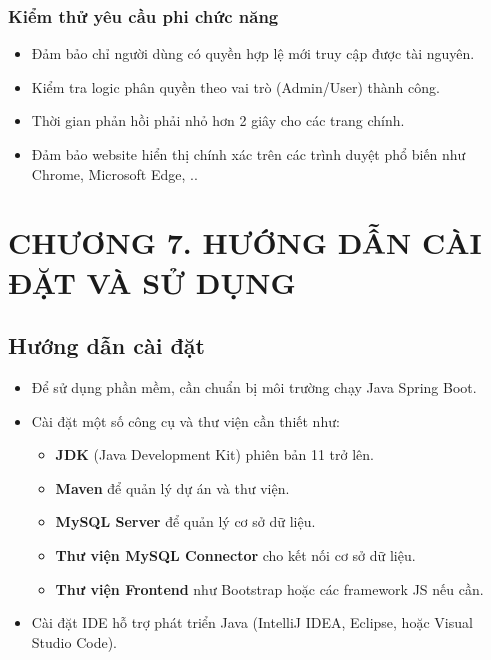 \documentclass{article}
\begin{document}
\subsubsection{Kiểm thử yêu cầu phi chức năng}
\begin{itemize}
    \item Đảm bảo chỉ người dùng có quyền hợp lệ mới truy cập được tài nguyên.
    \item Kiểm tra logic phân quyền theo vai trò (Admin/User) thành công.
    \item Thời gian phản hồi phải nhỏ hơn 2 giây cho các trang chính. 
    \item Đảm bảo website hiển thị chính xác trên các trình duyệt phổ biến như Chrome, Microsoft Edge, ..
\end{itemize}
 
\newpage

\section*{CHƯƠNG 7. HƯỚNG DẪN CÀI ĐẶT VÀ SỬ DỤNG}
\setcounter{section}{7}
\setcounter{subsection}{0}
\subsection{Hướng dẫn cài đặt}
\begin{itemize}
    \item Để sử dụng phần mềm, cần chuẩn bị môi trường chạy Java Spring Boot.
    \item Cài đặt một số công cụ và thư viện cần thiết như:
    \begin{itemize}
        \item \textbf{JDK} (Java Development Kit) phiên bản 11 trở lên.
        \item \textbf{Maven} để quản lý dự án và thư viện.
        \item \textbf{MySQL Server} để quản lý cơ sở dữ liệu.
        \item \textbf{Thư viện MySQL Connector} cho kết nối cơ sở dữ liệu.
        \item \textbf{Thư viện Frontend} như Bootstrap hoặc các framework JS nếu cần.
    \end{itemize}
    \item Cài đặt IDE hỗ trợ phát triển Java (IntelliJ IDEA, Eclipse, hoặc Visual Studio Code).
\end{itemize}
\end{document}
